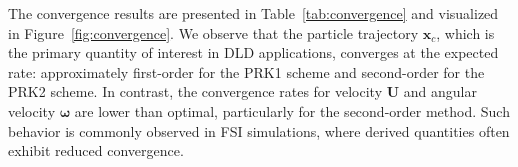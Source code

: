 \documentclass{article}
\begin{document}
The convergence results are presented in Table~\ref{tab:convergence} and visualized in Figure~\ref{fig:convergence}. We observe that the particle trajectory $\mathbf{x}_c$, which is the primary quantity of interest in DLD applications, converges at the expected rate: approximately first-order for the PRK1 scheme and second-order for the PRK2 scheme. In contrast, the convergence rates for velocity $\mathbf{U}$ and angular velocity $\boldsymbol{\omega}$ are lower than optimal, particularly for the second-order method.  Such behavior is commonly observed in FSI simulations, where derived quantities often exhibit reduced convergence. 

\end{document}
